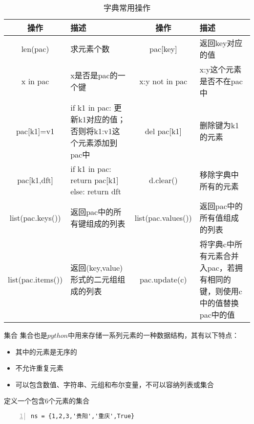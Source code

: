 \documentclass{beamer}
\begin{document}
\begin{frame}
\tiny{
\begin{table}[htp]
\caption{字典常用操作}
\begin{center}
\begin{tabular}{cp{11em}cp{11em}}
\toprule
\textbf{操作}&\textbf{描述}&\textbf{操作}&\textbf{描述}\\
\midrule
len(pac)&求元素个数&pac[key]&返回key对应的值\\
x in pac&x是否是pac的一个键&x:y not in pac&x:y这个元素是否不在pac中\\
pac[k1]=v1&if k1 in pac: 更新k1对应的值；否则将k1:v1这个元素添加到pac中&del pac[k1]&删除键为k1的元素\\
pac[k1,dft]&if k1 in pac: return pac[k1] else: return dft&d.clear()&移除字典中所有的元素\\
list(pac.keys())&返回pac中的所有键组成的列表&list(pac.values())&返回pac中的所有值组成的列表\\
list(pac.items())&返回(key,value)形式的二元组组成的列表&pac.update(c)&将字典c中所有元素合并入pac，若拥有相同的键，则使用c中的值替换pac中的值\\
\bottomrule
\end{tabular}
\end{center}
\label{dict}
\end{table}%
}
\end{frame}
\begin{frame}[fragile]{集合}
集合也是$python$中用来存储一系列元素的一种数据结构，其有以下特点：
\begin{itemize}
\item 其中的元素是无序的
\item 不允许重复元素
\item 可以包含数值、字符串、元组和布尔变量，不可以容纳列表或集合
\end{itemize}
\begin{block}{定义一个包含6个元素的集合}
\begin{Verbatim}[numbers=left,frame=single,rulecolor=\color{red}]
ns = {1,2,3,'贵阳','重庆',True}
\end{Verbatim}
\end{block}
\end{frame}
\end{document}
